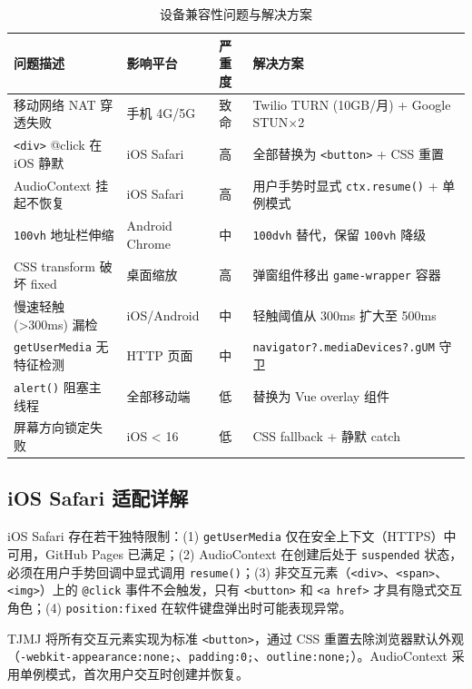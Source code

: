 \documentclass[11pt,a4paper]{article}
\begin{document}
\begin{table}[H]
\centering
\caption{设备兼容性问题与解决方案}
\label{tab:compat}
\footnotesize
\begin{tabular}{@{}p{2.5cm}p{1.6cm}p{1.4cm}p{3.5cm}@{}}
\toprule
\textbf{问题描述} & \textbf{影响平台} & \textbf{严重度} & \textbf{解决方案} \\
\midrule
移动网络 NAT 穿透失败 & 手机 4G/5G & 致命 & Twilio TURN (10GB/月) + Google STUN$\times$2 \\
\texttt{<div>} @click 在 iOS 静默 & iOS Safari & 高 & 全部替换为 \texttt{<button>} + CSS 重置 \\
AudioContext 挂起不恢复 & iOS Safari & 高 & 用户手势时显式 \texttt{ctx.resume()} + 单例模式 \\
\texttt{100vh} 地址栏伸缩 & Android Chrome & 中 & \texttt{100dvh} 替代，保留 \texttt{100vh} 降级 \\
CSS transform 破坏 fixed & 桌面缩放 & 高 & 弹窗组件移出 \texttt{game-wrapper} 容器 \\
慢速轻触 (>300ms) 漏检 & iOS/Android & 中 & 轻触阈值从 300ms 扩大至 500ms \\
\texttt{getUserMedia} 无特征检测 & HTTP 页面 & 中 & \texttt{navigator?.mediaDevices?.gUM} 守卫 \\
\texttt{alert()} 阻塞主线程 & 全部移动端 & 低 & 替换为 Vue overlay 组件 \\
屏幕方向锁定失败 & iOS < 16 & 低 & CSS fallback + 静默 catch \\
\bottomrule
\end{tabular}
\end{table}

\subsection{iOS Safari 适配详解}

iOS Safari 存在若干独特限制：(1) \texttt{getUserMedia} 仅在安全上下文（HTTPS）中可用，GitHub Pages 已满足；(2) AudioContext 在创建后处于 \texttt{suspended} 状态，必须在用户手势回调中显式调用 \texttt{resume()}；(3) 非交互元素（\texttt{<div>}、\texttt{<span>}、\texttt{<img>}）上的 \texttt{@click} 事件不会触发，只有 \texttt{<button>} 和 \texttt{<a href>} 才具有隐式交互角色；(4) \texttt{position:fixed} 在软件键盘弹出时可能表现异常。

TJMJ 将所有交互元素实现为标准 \texttt{<button>}，通过 CSS 重置去除浏览器默认外观（\texttt{-webkit-appearance:none;}、\texttt{padding:0;}、\texttt{outline:none;}）。AudioContext 采用单例模式，首次用户交互时创建并恢复。
\end{document}
